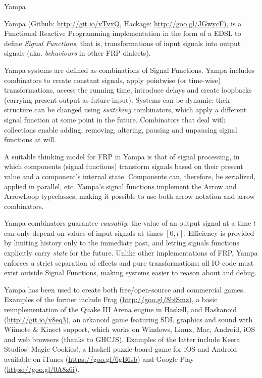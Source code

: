 \begin{hcarentry}[updated]{Yampa}
\label{yampa}
\makeheader

Yampa (Github: \href{http://git.io/vTvxQ}{http://git.io/vTvxQ}, Hackage:
\href{http://goo.gl/JGwycF}{http://goo.gl/JGwycF}), is a Functional Reactive
Programming implementation in the form of a EDSL to define \emph{Signal
Functions}, that is, transformations of input signals into output signals
(aka. \emph{behaviours} in other FRP dialects).

Yampa systems are defined as combinations of Signal Functions. Yampa includes
combinators to create constant signals, apply pointwise (or time-wise)
transformations, access the running time, introduce delays and create
loopbacks (carrying present output as future input). Systems can be
dynamic: their structure can be changed using \emph{switching}
combinators, which apply a different signal function at some point in
the future. Combinators that deal with collections enable adding,
removing, altering, pausing and unpausing signal functions at will.

A suitable thinking model for FRP in Yampa is that of signal
processing, in which components (signal functions) transform signals
based on their present value and a component's internal state.
Components can, therefore, be serialized, applied in parallel, etc.
Yampa's signal functions implement the Arrow and ArrowLoop
typeclasses, making it possible to use both arrow notation and arrow
combinators.

Yampa combinators guarantee \emph{causality}: the value of an output
signal at a time $t$ can only depend on values of input signals at
times $[0,t]$. Efficiency is provided by limiting history only to the
immediate past, and letting signals functions explicitly carry
\emph{state} for the future.  Unlike other implementations of FRP,
Yampa enforces a strict separation of effects and pure
transformations: all IO code must exist outside Signal Functions,
making systems easier to reason about and debug.

Yampa has been used to create both free/open-source and commercial games.
Examples of the former include Frag
(\href{http://goo.gl/8bfSmz}{http://goo.gl/8bfSmz}), a basic reimplementation
of the Quake III Arena engine in Haskell, and Haskanoid
(\href{http://git.io/v8eq3}{http://git.io/v8eq3}), an arkanoid game featuring
SDL graphics and sound with Wiimote \& Kinect support, which works on Windows,
Linux, Mac, Android, iOS and web browsers (thanks to GHCJS). Examples of the
latter include Keera Studios' Magic Cookies!, a Haskell puzzle board game for
iOS and Android available on iTunes
(\href{https://goo.gl/6gB6sb}{https://goo.gl/6gB6sb})
and Google Play
(\href{https://goo.gl/0A8z6i}{https://goo.gl/0A8z6i}).


\end{hcarentry}
